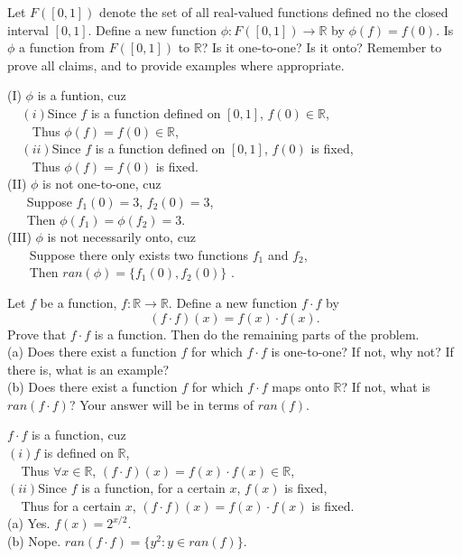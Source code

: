 \documentclass[11pt, a4paper, UTF8]{ctexart}
\begin{document}
\begin{problem}[UD: 14.13]
  Let $F([0,1])$ denote the set of all real-valued functions defined no the closed 
  interval $[0,1]$. Define a new function $\phi:F([0,1]) \rightarrow \mathbb{R}$ by 
  $\phi(f) = f(0)$. Is $\phi$ a function from $F([0,1])$ to $\mathbb{R}$? Is it one-to-one? 
  Is it onto? Remember to prove all claims, and to provide examples where appropriate.
\end{problem}

\begin{solution}
  (I) $\phi$ is a funtion, cuz\\
  $~~~~~(i)$Since $f$ is a function defined on $[0,1]$, $f(0) \in \mathbb{R}$,\\
  $~~~~~~~~~$Thus $\phi(f) = f(0) \in \mathbb{R}$,\\
  $~~~~~(ii)$Since $f$ is a function defined on $[0,1]$, $f(0)$ is fixed,\\
  $~~~~~~~~~$Thus $\phi(f) = f(0)$ is fixed.\\
  (II) $\phi$ is not one-to-one, cuz\\
  $~~~~~~~$Suppose $f_{1}(0) = 3$, $f_{2}(0) = 3$,\\
  $~~~~~~~$Then $\phi(f_{1}) = \phi(f_{2}) = 3$.\\
  (III) $\phi$ is not necessarily onto, cuz\\
  $~~~~~~~~$Suppose there only exists two functions $f_{1}$ and $f_{2}$,\\
  $~~~~~~~~$Then $ran(\phi) = \{f_{1}(0),f_{2}(0)\}$ .
\end{solution}

\begin{problem}[UD: 14.15]
  Let $f$ be a function, $f:\mathbb{R} \rightarrow \mathbb{R}$. Define a new function 
  $f \cdot f$ by
  $$(f \cdot f)(x) = f(x) \cdot f(x).$$ 
  Prove that $f \cdot f$ is a function. Then do the remaining parts of the problem.\\
  (a) Does there exist a function $f$ for which $f \cdot f$ is one-to-one? If not, 
  why not? If there is, what is an example?\\
  (b) Does there exist a function $f$ for which $f \cdot f$ maps onto $\mathbb{R}$? 
  If not, what is $ran(f \cdot f)$? Your answer will be in terms of $ran(f)$.
\end{problem}

\begin{solution}
  $f \cdot f$ is a function, cuz\\
  $(i)f$ is defined on $\mathbb{R}$,\\
  $~~~~~$Thus $\forall x \in \mathbb{R}$, $(f \cdot f)(x) = f(x) \cdot f(x) \in \mathbb{R}$,\\
  $(ii)$Since $f$ is a function, for a certain $x$, $f(x)$ is fixed,\\
  $~~~~~$Thus for a certain $x$, $(f \cdot f)(x) = f(x) \cdot f(x)$ is fixed.\\
  (a) Yes. $f(x) = 2^{x/2}$.\\
  (b) Nope. $ran(f \cdot f) = \{y^{2}:y \in ran(f)\}$.
\end{solution}
\end{document}
